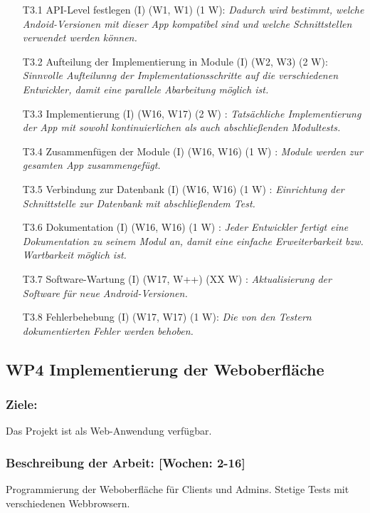 \documentclass{scrreprt}
\begin{document}
\begin{enumerate}
\item [T3.1] API-Level festlegen (I) (W1, W1) (1 W): \emph{ Dadurch wird bestimmt, welche Andoid-Versionen mit dieser App kompatibel sind und welche Schnittstellen verwendet werden können.}
\item [T3.2] Aufteilung der Implementierung in Module (I) (W2, W3) (2 W): \emph{ Sinnvolle Aufteilunng der Implementationsschritte auf die verschiedenen Entwickler, damit eine parallele Abarbeitung möglich ist.}
\item [T3.3] Implementierung (I) (W16, W17) (2 W) : \emph{ Tatsächliche Implementierung der App mit sowohl kontinuierlichen als auch abschließenden Modultests.}
\item [T3.4] Zusammenfügen der Module (I) (W16, W16) (1 W) : \emph{ Module werden zur gesamten App zusammengefügt.}
\item [T3.5] Verbindung zur Datenbank (I) (W16, W16) (1 W) : \emph{ Einrichtung der Schnittstelle zur Datenbank mit abschließendem Test.}
\item [T3.6] Dokumentation (I) (W16, W16) (1 W) : \emph{ Jeder Entwickler fertigt eine Dokumentation zu seinem Modul an, damit eine einfache Erweiterbarkeit bzw. Wartbarkeit möglich ist.}
\item [T3.7] Software-Wartung (I) (W17, W++) (XX W) : \emph{ Aktualisierung der Software für neue Android-Versionen.}
\item [T3.8] Fehlerbehebung (I) (W17, W17) (1 W): \emph{Die von den Testern dokumentierten Fehler werden behoben.}
\end{enumerate}

\subsection*{WP4 Implementierung der Weboberfläche}

\subsubsection{Ziele:} Das Projekt ist als Web-Anwendung verfügbar.
\subsubsection{Beschreibung der Arbeit: [Wochen: 2-16]} Programmierung der Weboberfläche für Clients und Admins. Stetige Tests mit verschiedenen Webbrowsern.
\end{document}
